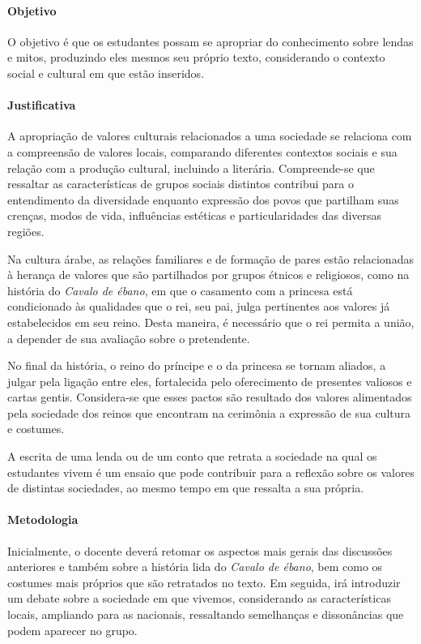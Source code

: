 \documentclass[11pt]{extarticle}
\begin{document}
\paragraph{Objetivo} O objetivo é que os estudantes possam se apropriar do conhecimento sobre lendas e mitos, produzindo eles mesmos seu próprio texto, considerando o contexto social e cultural em que estão inseridos.

\paragraph{Justificativa} A apropriação de valores culturais relacionados a uma sociedade se relaciona com a compreensão de valores locais, comparando diferentes contextos sociais e sua relação com a produção cultural, incluindo a literária. Compreende-se que ressaltar as características de grupos sociais distintos contribui para o entendimento da diversidade enquanto expressão dos povos que partilham suas crenças, modos de vida, influências estéticas e particularidades das diversas regiões.

Na cultura árabe, as relações familiares e de formação de pares estão relacionadas à herança de valores que são partilhados por grupos étnicos e religiosos,  como na história do \textit{Cavalo de ébano}, em que o casamento com a princesa está condicionado às qualidades que o rei, seu pai, julga pertinentes aos valores já estabelecidos em seu reino. Desta maneira, é necessário que o rei permita a união, a depender de sua avaliação sobre o pretendente.

No final da história, o reino do príncipe e o da princesa se tornam aliados, a julgar pela ligação entre eles, fortalecida pelo oferecimento de presentes valiosos e cartas gentis. Considera-se que esses pactos são resultado dos valores alimentados pela sociedade dos reinos que encontram na cerimônia a expressão de sua cultura e costumes.

A escrita de uma lenda ou de um conto que retrata a sociedade na qual os estudantes vivem é um ensaio que pode contribuir para a reflexão sobre os valores de distintas sociedades, ao mesmo tempo em que ressalta a sua própria.

\paragraph{Metodologia} Inicialmente, o docente deverá retomar os aspectos mais gerais das discussões anteriores e também sobre a história lida do \textit{Cavalo de ébano}, bem como os costumes mais próprios que são retratados no texto. Em seguida, irá introduzir um debate sobre a sociedade em que vivemos, considerando as características locais, ampliando para as nacionais, ressaltando semelhanças e dissonâncias que podem aparecer no grupo. 
\end{document}
